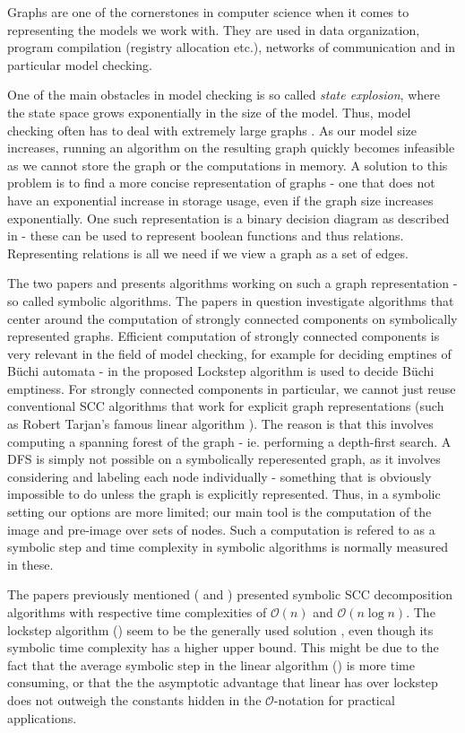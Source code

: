 \documentclass[../master/master.tex]{subfiles}
\begin{document}
Graphs are one of the cornerstones in computer science when it comes to representing the models we work with. They are used in data organization,  program compilation (registry allocation etc.), networks of communication and in particular model checking.

One of the main obstacles in model checking is so called \textit{state explosion}, where the state space grows exponentially in the size of the model. Thus, model checking often has to deal with extremely large graphs \cite{pelanek_2004}. As our model size increases, running an algorithm on the resulting graph quickly becomes infeasible as we cannot store the graph or the computations in memory. A solution to this problem is to find a more concise representation of graphs - one that does not have an exponential increase in storage usage, even if the graph size increases exponentially. One such representation is a binary decision diagram as described in \cite{bryant_1992} - these can be used to represent boolean functions and thus relations. Representing relations is all we need if we view a graph as a set of edges.

The two papers \cite{linear} and \cite{lockstep} presents algorithms working on such a graph representation - so called symbolic algorithms. The papers in question investigate algorithms that center around the computation of strongly connected components on symbolically represented graphs. Efficient computation of strongly connected components is very relevant in the field of model checking, for example for deciding emptines of Büchi automata - in \cite{lockstep} the proposed Lockstep algorithm is used to decide Büchi emptiness.  For strongly connected components in particular, we cannot just reuse conventional SCC algorithms that work for explicit graph representations (such as Robert Tarjan's famous linear algorithm \cite{tarjan_1971}). The reason is that this involves computing a spanning forest of the graph - ie. performing a depth-first search. A DFS is simply not possible on a symbolically reperesented graph, as it involves considering and labeling each node individually - something that is obviously impossible to do unless the graph is explicitly represented. Thus, in a symbolic setting our options are more limited; our main tool is the computation of the image and pre-image over sets of nodes. Such a computation is refered to as a symbolic step and time complexity in symbolic algorithms is normally measured in these.

The papers previously mentioned (\cite{linear} and \cite{lockstep}) presented symbolic SCC decomposition algorithms with respective time complexities of $\mathcal{O}(n)$ and  $\mathcal{O}(n \log n)$. The lockstep algorithm (\cite{lockstep}) seem to be the generally used solution , even though its symbolic time complexity has a higher upper bound. This might be due to the fact that the average symbolic step in the linear algorithm (\cite{linear}) is more time consuming, or that the the asymptotic advantage that linear has over lockstep does not outweigh the constants hidden in the $\mathcal{O} $-notation for practical applications.
\end{document}
